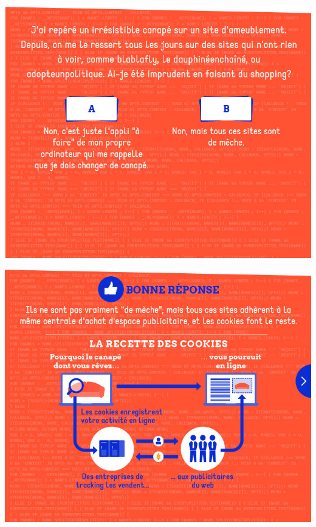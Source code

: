 \documentclass{beamer}
\begin{document}
\begin{frame}\includegraphics[scale=0.6] {./images/Quizz_HygieneNumerique_France4_40.jpg} \end{frame}
\begin{frame}\includegraphics[scale=0.6] {./images/Quizz_HygieneNumerique_France4_41.jpg} \end{frame}
\end{document}
